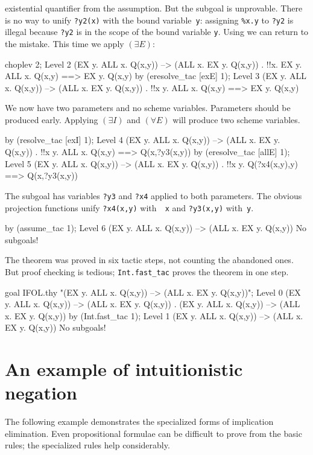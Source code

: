 existential quantifier from the assumption.  But the subgoal is unprovable.
There is no way to unify {\tt ?y2(x)} with the bound variable~{\tt y}:
assigning \verb|%x.y| to {\tt ?y2} is illegal because {\tt ?y2} is in the
scope of the bound variable {\tt y}.  Using  we
can return to the mistake.  This time we apply $({\exists}E)$:
\begin{ttbox}
choplev 2;
{\out Level 2}
{\out (EX y. ALL x. Q(x,y)) --> (ALL x. EX y. Q(x,y))}
{. !!x. EX y. ALL x. Q(x,y) ==> EX y. Q(x,y)}
\ttbreak
by (eresolve_tac [exE] 1);
{\out Level 3}
{\out (EX y. ALL x. Q(x,y)) --> (ALL x. EX y. Q(x,y))}
{. !!x y. ALL x. Q(x,y) ==> EX y. Q(x,y)}
\end{ttbox}
We now have two parameters and no scheme variables.  Parameters should be
produced early.  Applying $({\exists}I)$ and $({\forall}E)$ will produce
two scheme variables.
\begin{ttbox}
by (resolve_tac [exI] 1);
{\out Level 4}
{\out (EX y. ALL x. Q(x,y)) --> (ALL x. EX y. Q(x,y))}
{. !!x y. ALL x. Q(x,y) ==> Q(x,?y3(x,y))}
\ttbreak
by (eresolve_tac [allE] 1);
{\out Level 5}
{\out (EX y. ALL x. Q(x,y)) --> (ALL x. EX y. Q(x,y))}
{. !!x y. Q(?x4(x,y),y) ==> Q(x,?y3(x,y))}
\end{ttbox}
The subgoal has variables {\tt ?y3} and {\tt ?x4} applied to both
parameters.  The obvious projection functions unify {\tt?x4(x,y)} with~{\tt
x} and \verb|?y3(x,y)| with~{\tt y}.
\begin{ttbox}
by (assume_tac 1);
{\out Level 6}
{\out (EX y. ALL x. Q(x,y)) --> (ALL x. EX y. Q(x,y))}
{\out No subgoals!}
\end{ttbox}
The theorem was proved in six tactic steps, not counting the abandoned
ones.  But proof checking is tedious; {\tt Int.fast_tac} proves the
theorem in one step.
\begin{ttbox}
goal IFOL.thy "(EX y. ALL x. Q(x,y)) -->  (ALL x. EX y. Q(x,y))";
{\out Level 0}
{\out (EX y. ALL x. Q(x,y)) --> (ALL x. EX y. Q(x,y))}
{. (EX y. ALL x. Q(x,y)) --> (ALL x. EX y. Q(x,y))}
by (Int.fast_tac 1);
{\out Level 1}
{\out (EX y. ALL x. Q(x,y)) --> (ALL x. EX y. Q(x,y))}
{\out No subgoals!}
\end{ttbox}


\section{An example of intuitionistic negation}
The following example demonstrates the specialized forms of implication
elimination.  Even propositional formulae can be difficult to prove from
the basic rules; the specialized rules help considerably.  

